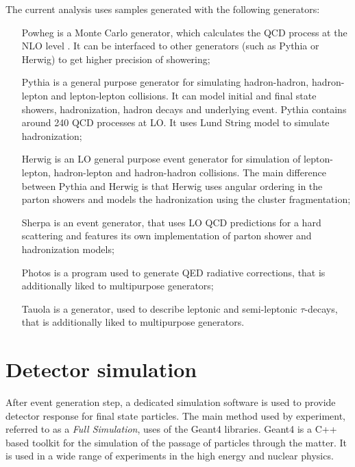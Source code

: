 The current analysis uses samples generated with the following generators:
\begin{itemize}[align=left]
\item[Powheg \cite{Powheg}]  is a Monte Carlo generator, which calculates the QCD process at the NLO level \cite{PowhegNLO}. It can be interfaced to other generators (such as Pythia or Herwig) to get higher precision of showering;
\item[Pythia \cite{Pythia6}]  is a general purpose generator for simulating hadron-hadron, hadron-lepton and lepton-lepton collisions. It can model initial and final state showers, hadronization, hadron decays and underlying event. Pythia contains around 240 QCD processes at LO. It uses Lund String model \cite{LundString} to simulate hadronization;
\item[Herwig \cite{Herwig}] is an LO general purpose event generator for simulation of lepton-lepton, hadron-lepton and hadron-hadron collisions. The main difference between Pythia and Herwig is that Herwig uses angular ordering in the parton showers\cite{hep-ph/0612282} and models the hadronization using the cluster fragmentation\cite{Kupco:390985};
\item[Sherpa \cite{Sherpa}]  is an event generator, that uses LO QCD predictions for a hard scattering and features its own implementation of parton shower and hadronization models;
\item[Photos \cite{Photos}]  is a program used to generate QED radiative corrections, that is additionally liked to  multipurpose generators;
\item[Tauola \cite{taluola}] is a generator, used to describe leptonic and semi-leptonic $\tau$-decays, that is additionally liked to  multipurpose generators.
\end{itemize}

\section{Detector simulation}

After event generation step, a dedicated simulation software is used to provide detector response for final state particles. The main method used by \atlas experiment, referred to as a \textit{Full Simulation}, uses of the Geant4\cite{Geant4} libraries. Geant4 is a C++ based toolkit for the simulation of the passage of particles through the matter. It is used in a wide range of experiments in the high energy and nuclear physics.

